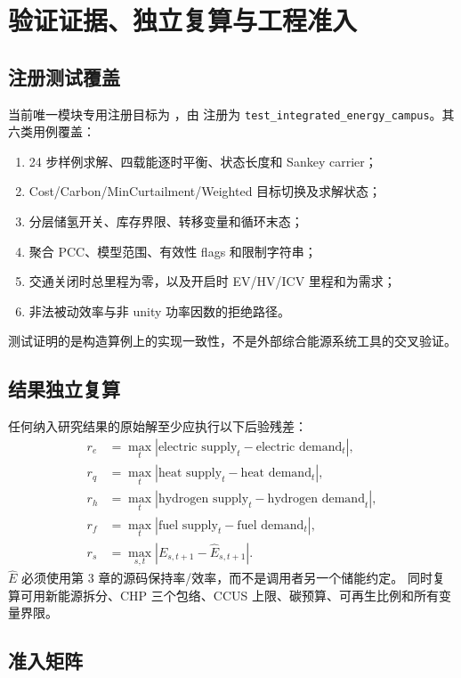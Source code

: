 \section{验证证据、独立复算与工程准入}

\subsection{注册测试覆盖}

当前唯一模块专用注册目标为 ，由
 注册为 \texttt{test\_integrated\_energy\_campus}。其六类用例覆盖：
\begin{enumerate}
  \item 24 步样例求解、四载能逐时平衡、状态长度和 Sankey carrier；
  \item Cost/Carbon/MinCurtailment/Weighted 目标切换及求解状态；
  \item 分层储氢开关、库存界限、转移变量和循环末态；
  \item 聚合 PCC、模型范围、有效性 flags 和限制字符串；
  \item 交通关闭时总里程为零，以及开启时 EV/HV/ICV 里程和为需求；
  \item 非法被动效率与非 unity 功率因数的拒绝路径。
\end{enumerate}
测试证明的是构造算例上的实现一致性，不是外部综合能源系统工具的交叉验证。

\subsection{结果独立复算}

任何纳入研究结果的原始解至少应执行以下后验残差：
\begin{align}
r_e&=\max_t|\text{electric supply}_t-\text{electric demand}_t|,\\
r_q&=\max_t|\text{heat supply}_t-\text{heat demand}_t|,\\
r_h&=\max_t|\text{hydrogen supply}_t-\text{hydrogen demand}_t|,\\
r_f&=\max_t|\text{fuel supply}_t-\text{fuel demand}_t|,\\
r_s&=\max_{s,t}|E_{s,t+1}-\widehat E_{s,t+1}|.
\end{align}
$\widehat E$ 必须使用第 3 章的源码保持率/效率，而不是调用者另一个储能约定。
同时复算可用新能源拆分、CHP 三个包络、CCUS 上限、碳预算、可再生比例和所有变量界限。

\subsection{准入矩阵}

